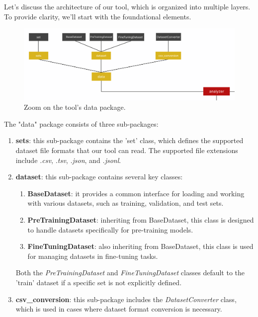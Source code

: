 \noindent Let's discuss the architecture of our tool, which is organized into multiple layers. To provide clarity, we'll start with the foundational elements.

\begin{figure}[ht]
	\centering\includegraphics[width=400pt]{figs/zoom-data.PNG}
	\captionsetup{justification=centering}
	\caption{Zoom on the tool's data package.}
	\label{fig:zoom-data}
\end{figure}

\noindent The "data" package consists of three sub-packages:
	\begin{enumerate}
		\item \textbf{sets}: this sub-package contains the 'set' class, which defines the supported dataset file formats that our tool can read. The supported file extensions include \textit{.csv}, \textit{.tsv}, \textit{.json}, and \textit{.jsonl}.
		\item \textbf{dataset}: this sub-package contains several key classes:
			\begin{enumerate}
				\item \textbf{BaseDataset}: it provides a common interface for loading and working with various datasets, such as training, validation, and test sets.
				\item \textbf{PreTrainingDataset}: inheriting from BaseDataset, this class is designed to handle datasets specifically for pre-training models.
				\item \textbf{FineTuningDataset}: also inheriting from BaseDataset, this class is used for managing datasets in fine-tuning tasks.
			\end{enumerate}
		Both the \textit{PreTrainingDataset} and \textit{FineTuningDataset} classes default to the 'train' dataset if a specific set is not explicitly defined.
		\item \textbf{csv\_conversion}: this sub-package includes the \textit{DatasetConverter} class, which is used in cases where dataset format conversion is necessary.
	\end{enumerate}
	
